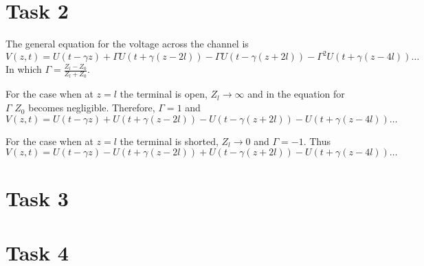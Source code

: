 \documentclass[11pt,titlepage]{report}
\begin{document}
\section{Task 2}
The general equation for the voltage across the channel is 
\begin{equation}
V(z,t)=U(t-\gamma z) + \Gamma U(t+\gamma(z-2l))-\Gamma U(t-\gamma(z+2l))-\Gamma^2U(t+\gamma(z-4l))\dots
\end{equation}
In which $\Gamma=\frac{Z_l-Z_0}{Z_l+Z_0}$.

For the case when at $z=l$ the terminal is open, $Z_l \to \infty$ and in the equation for $\Gamma$ $Z_0$ becomes negligible. Therefore, $\Gamma=1$ and 
\begin{equation}
V(z,t)=U(t-\gamma z) + U(t+\gamma(z-2l))- U(t-\gamma(z+2l))- U(t+\gamma(z-4l))\dots
\end{equation}

For the case when at $z=l$ the terminal is shorted, $Z_l \to 0$ and $\Gamma=-1$. Thus 
\begin{equation}
V(z,t)=U(t-\gamma z) - U(t+\gamma(z-2l))+U(t-\gamma(z+2l))-U(t+\gamma(z-4l))\dots
\end{equation}


\section{Task 3}


\section{Task 4}
\end{document}
